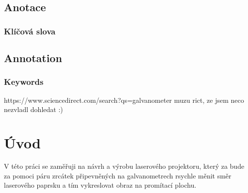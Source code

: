 \documentclass{template/socthesis}
\author{Šimon Hrouda}
\begin{document}
\newcommand{\bardgen}[3]{following text generated by ai (google bard) on #1\\%
  \begin{tcolorbox}[breakable, colback=blue!20]
    #2
  \end{tcolorbox}
  \begin{tcolorbox}[breakable, colback=blue!10, colframe=white]
    #3
  \end{tcolorbox}
}


\maketitle



\pagestyle{empty}

\section*{Anotace}


\subsection*{Klíčová slova}


\vspace{20mm}

\section*{Annotation}


\subsection*{Keywords}


\newpage
\pagestyle{plain}

\tableofcontents %

\setcounter{figure}{0}
\setcounter{table}{0}
\newpage

https://www.sciencedirect.com/search?qs=galvanometer
muzu rict, ze jsem neco nezvladl dohledat :)

\chapter*{Úvod}
V této práci se zaměřuji na návrh a výrobu laserového projektoru, který za bude za pomoci páru zrcátek připevněných na galvanometrech rsychle měnit směr laserového paprsku a tím vykreslovat obraz na promítací plochu.
\end{document}
